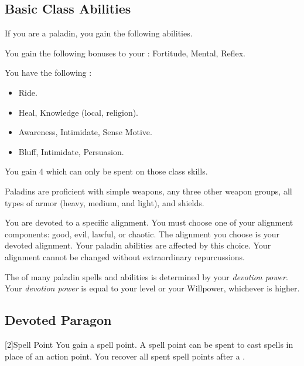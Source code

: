     \subsection{Basic Class Abilities}
        If you are a paladin, you gain the following abilities.

        You gain the following bonuses to your :  Fortitude,  Mental,  Reflex.

        You have the following :
        \begin{itemize}
            \item {} Ride.
            \item {} Heal, Knowledge (local, religion).
            \item {} Awareness, Intimidate, Sense Motive.
            \item {} Bluff, Intimidate, Persuasion.
        \end{itemize}
        You gain 4  which can only be spent on those class skills.

        Paladins are proficient with simple weapons, any three other weapon groups, all types of armor (heavy, medium, and light), and shields.

        You are devoted to a specific alignment.
        You must choose one of your alignment components: good, evil, lawful, or chaotic.
        The alignment you choose is your devoted alignment.
        Your paladin abilities are affected by this choice.
        Your alignment cannot be changed without extraordinary repurcussions.

        The  of many paladin spells and abilities is determined by your \textit{devotion power}.
        Your \textit{devotion power} is equal to your level or your Willpower, whichever is higher.

    \subsection{Devoted Paragon}

        [2]{Spell Point}
        You gain a spell point.
        A spell point can be spent to cast spells in place of an action point.
        You recover all spent spell points after a .

